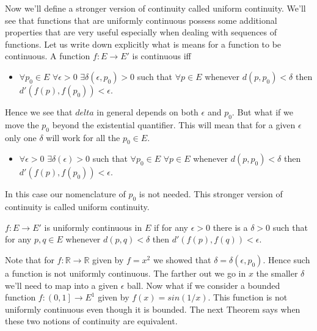 Now we'll define a stronger version of continuity called uniform continuity. We'll see that
functions that are uniformly continuous possess some additional properties that are very useful
especially when dealing with sequences of functions.
Let us write down explicitly what is means for a function to be continuous.
A function $f : E \to E'$ is continuous iff
\begin{itemize}
    \item
	$\forall p_0 \in E$ $\forall \epsilon > 0$ $\exists \delta(\epsilon,p_0) > 0$ such that
	$\forall p \in E$ whenever $d(p,p_0) < \delta $ then $d'(f(p),f(p_0)) < \epsilon$.
\end{itemize}
Hence we see that $delta$ in general depends on both $\epsilon$ and $p_0$. But what if we move the
$p_0$ beyond the existential quantifier. This will mean that for a given $\epsilon$ only one
$\delta$ will work for all the $p_0 \in E$. 
\begin{itemize}
    \item
	$\forall \epsilon > 0$ $\exists \delta(\epsilon) > 0$ such that
	$\forall p_0 \in E$ $\forall p \in E$ whenever $d(p,p_0) < \delta $ then $d'(f(p),f(p_0)) <
	\epsilon$.
\end{itemize}
In this case our nomenclature of $p_0$ is not needed. This stronger version of continuity is called
uniform continuity.
\begin{Definition}
    $f : E \to E'$ is uniformly continuous in $E$ if for any $\epsilon > 0$ there is a $\delta > 0$
    such that for any $p,q \in E$ whenever $d(p,q) < \delta$ then $d'(f(p),f(q)) < \epsilon$.
\end{Definition} 
Note that for $f : \mathbb{R} \to \mathbb{R}$ given by $f = x^2$ we showed that $\delta =
\delta(\epsilon,p_0)$. Hence such a function is not uniformly continuous. The farther out we go in
$x$ the smaller $\delta$ we'll need to map into a given $\epsilon$ ball. Now what if we consider a
bounded function $f : \left(0,1\right] \to E^1$ given by $f(x) = sin(1/x)$. This function is not
uniformly continuous even though it is bounded. The next Theorem says when these two notions of
continuity are equivalent. 

